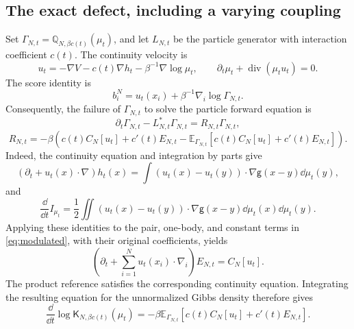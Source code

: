 \documentclass[11pt,reqno]{amsart}
\numberwithin{equation}{section}
\theoremstyle{plain}
\theoremstyle{remark}
\newcommand{\E}{\mathbb E}\newcommand{\Q}{\mathbb Q}\newcommand{\Pb}{\mathbb P}
\newcommand{\K}{\mathsf K}\newcommand{\g}{\mathsf g}\newcommand{\Fr}{\mathsf F}
\DeclareMathOperator{\diver}{div}
\begin{document}
\subsection{The exact defect, including a varying coupling}
Set $\Gamma_{N,t}=\Q_{N,\beta c(t)}(\mu_t)$, and let $L_{N,t}$ be the particle generator with interaction coefficient $c(t)$. The continuity velocity is
\begin{equation}\label{eq:velocity-coupling}
 u_t=-\nabla V-c(t)\nabla h_t-\beta^{-1}\nabla\log\mu_t,
              \qquad\partial_t\mu_t+\diver(\mu_tu_t)=0.
\end{equation}
The score identity is
\begin{equation}\label{eq:score}
 b_i^N=u_t(x_i)+\beta^{-1}\nabla_i\log\Gamma_{N,t}.
\end{equation}
Consequently, the failure of $\Gamma_{N,t}$ to solve the particle forward equation is
\begin{equation}\label{eq:defect}
 \partial_t\Gamma_{N,t}-L_{N,t}^*\Gamma_{N,t}=R_{N,t}\Gamma_{N,t},
\end{equation}
\begin{equation}\label{eq:defect-coupling}
 R_{N,t}=-\beta\left(c(t)C_N[u_t]+c'(t)E_{N,t}
                  -\E_{\Gamma_{N,t}}[c(t)C_N[u_t]+c'(t)E_{N,t}]\right).
\end{equation}
Indeed, the continuity equation and integration by parts give
\begin{equation}\label{eq:static-material-potential}
 (\partial_t+u_t(x)\cdot\nabla)h_t(x)
 =\int(u_t(x)-u_t(y))\cdot\nabla\g(x-y)\dd\mu_t(y),
\end{equation}
and
\begin{equation}\label{eq:static-material-background-energy}
 \frac{\dd}{\dd t}I_{\mu_t}
 =\frac12\iint(u_t(x)-u_t(y))\cdot\nabla\g(x-y)
                    \dd\mu_t(x)\dd\mu_t(y).
\end{equation}
Applying these identities to the pair, one-body, and constant terms in \eqref{eq:modulated}, with their original coefficients, yields
\begin{equation}\label{eq:static-material-particle-energy}
 \left(\partial_t+\sum_{i=1}^N u_t(x_i)\cdot\nabla_i\right)E_{N,t}
 =C_N[u_t].
\end{equation}
The product reference satisfies the corresponding continuity equation. Integrating the resulting equation for the unnormalized Gibbs density therefore gives
\begin{equation}\label{eq:static-normalizer-derivative}
 \frac{\dd}{\dd t}\log\K_{N,\beta c(t)}(\mu_t)
 =-\beta\E_{\Gamma_{N,t}}[c(t)C_N[u_t]+c'(t)E_{N,t}].
\end{equation}
\end{document}
